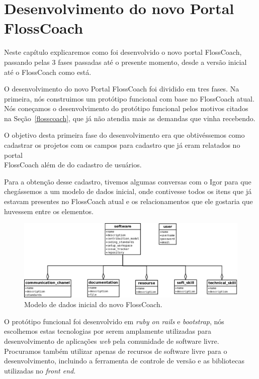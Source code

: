 \chapter{Desenvolvimento do novo Portal \\FlossCoach}

Neste capítulo explicaremos como foi desenvolvido o novo portal FlossCoach, passando
pelas 3 fases passadas até o presente momento, desde a versão inicial até o FlossCoach
como está.

O desenvolvimento do novo Portal FlossCoach foi dividido em tres fases. Na primeira, 
nós construimos um protótipo funcional com base no FlossCoach atual. Nós coneçamos o
desenvolvimento do protótipo funcional pelos motivos citados na Seção~\ref{flosscoach},
que já não atendia mais as demandas que vinha recebendo.

O objetivo desta primeira fase do desenvolvimento era que obtivéssemos como cadastrar 
os projetos com os campos para cadastro que já eram relatados no portal \\FlossCoach 
além de do cadastro de usuários.

Para a obtenção desse cadastro, tivemos algumas conversas com o Igor para que chegássemos
a um modelo de dados inicial, onde contivesse todos os itens que já estavam presentes no
FlossCoach atual e os relacionamentos que ele gostaria que huvessem entre os elementos.

\begin{figure}[h]
	\centering
	\label{fig:diagrama_iicial}
		\includegraphics[keepaspectratio=true,scale=0.35]{figuras/diagrama_inicial.eps}
	\caption{Modelo de dados inicial do novo FlossCoach.}
\end{figure}

O protótipo funcional foi desenvolvido em \textit{ruby on rails} e \textit{bootstrap},
nós escolhemos estas tecnologias por serem amplamente utilizadas para desenvolvimento
de aplicações \textit{web} pela comunidade de software livre. Procuramos também utilizar
apenas de recursos de software livre para o desenvolvimento, incluindo a ferramenta de 
controle de versão e as bibliotecas utilizadas no \textit{front end}.

